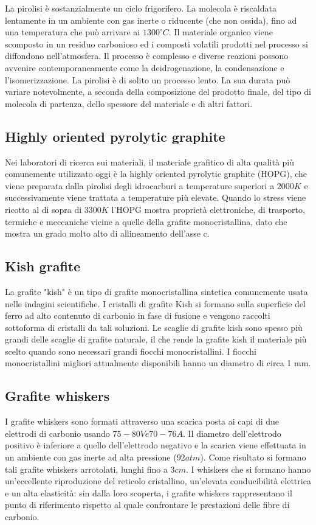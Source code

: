 \documentclass[a4paper,titlepage]{book}
\begin{document}
La pirolisi è sostanzialmente un ciclo frigorifero. La molecola è riscaldata lentamente in un ambiente con gas inerte o riducente (che non ossida), fino ad una temperatura che può arrivare ai $1300 ^\circ C$. Il materiale organico viene scomposto in un residuo carbonioso ed i composti volatili prodotti nel processo si diffondono nell'atmosfera. Il processo è complesso e diverse reazioni possono avvenire contemporaneamente come la deidrogenazione, la condensazione e l'isomerizzazione. La pirolisi è di solito un processo lento. La sua durata può variare notevolmente, a seconda della composizione del prodotto finale, del tipo di molecola di partenza, dello spessore del materiale e di altri fattori.
\subsection{Highly oriented pyrolytic graphite}
Nei laboratori di ricerca sui materiali, il materiale grafitico di alta qualità più comunemente utilizzato oggi è la highly oriented pyrolytic graphite (HOPG), che viene preparata dalla pirolisi degli idrocarburi a temperature superiori a $2000 K$ e successivamente viene trattata a temperature più elevate. Quando lo stress viene ricotto al di sopra di $3300 K$ l'HOPG mostra proprietà elettroniche, di trasporto, termiche e meccaniche vicine a quelle della grafite monocristallina, dato che mostra un grado molto alto di allineamento dell'asse c. 
\subsection{Kish grafite}
La grafite "kish" è un tipo di grafite monocristallina sintetica comunemente usata nelle indagini scientifiche. I cristalli di grafite Kish si formano sulla superficie del ferro ad alto contenuto di carbonio in fase di fusione e vengono raccolti sottoforma di cristalli da tali soluzioni. Le scaglie di grafite kish sono spesso più grandi delle scaglie di grafite naturale, il che rende la grafite kish il materiale più scelto quando sono necessari grandi fiocchi monocristallini. I fiocchi monocristallini migliori attualmente disponibili hanno un diametro di circa 1 mm.
\subsection{Grafite whiskers}
I grafite whiskers sono formati attraverso una scarica posta ai capi di due elettrodi di carbonio usando $75-80 V e 70-76 A$. Il diametro dell'elettrodo positivo è inferiore a quello dell'elettrodo negativo e la scarica viene effettuata in un ambiente con gas inerte ad alta pressione ($92 atm$). Come risultato si formano tali grafite whiskers arrotolati, lunghi fino a $3 cm$. I whiskers che si formano hanno un'eccellente riproduzione del reticolo cristallino, un'elevata conducibilità elettrica e un alta elasticità: sin dalla loro scoperta, i grafite whiskers rappresentano il punto di riferimento rispetto al quale confrontare le prestazioni delle fibre di carbonio. 
\end{document}
